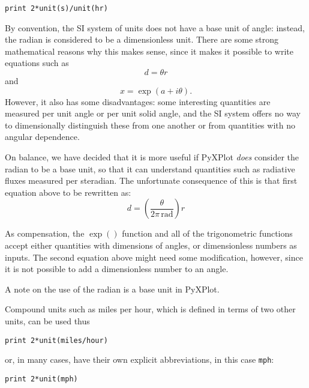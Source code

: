 \begin{verbatim}
print 2*unit(s)/unit(hr)
\end{verbatim}

\begin{boxout}
By convention, the SI system of units does not have a base unit of angle:
instead, the radian is considered to be a dimensionless unit.  There are some
strong mathematical reasons why this makes sense, since it makes it possible to
write equations such as
\begin{displaymath}
d=\theta r
\end{displaymath}
and
\begin{displaymath}
x = \exp(a+i\theta).
\end{displaymath}
However, it also has some disadvantages: some interesting quantities are
measured per unit angle or per unit solid angle, and the SI system offers no
way to dimensionally distinguish these from one another or from quantities with
no angular dependence.

On balance, we have decided that it is more useful if PyXPlot {\it does}
consider the radian to be a base unit, so that it can understand quantities
such as radiative fluxes measured per steradian. The unfortunate consequence of
this is that first equation above to be rewritten as:
\begin{displaymath}
d=\left(\frac{\theta}{2\pi\,\mathrm{rad}}\right) r
\end{displaymath}

As compensation, the $\exp()$ function and all of the trigonometric functions
accept either quantities with dimensions of angles, or dimensionless numbers as
inputs. The second equation above might need some modification, however, since
it is not possible to add a dimensionless number to an angle.
\caption{A note on the use of the radian is a base unit in PyXPlot.}
\end{boxout}

Compound units such as miles per hour, which is defined in terms of two other
units, can be used thus

\begin{verbatim}
print 2*unit(miles/hour)
\end{verbatim}

\noindent or, in many cases, have their own explicit abbreviations, in this
case {\tt mph}:

\begin{verbatim}
print 2*unit(mph)
\end{verbatim}

